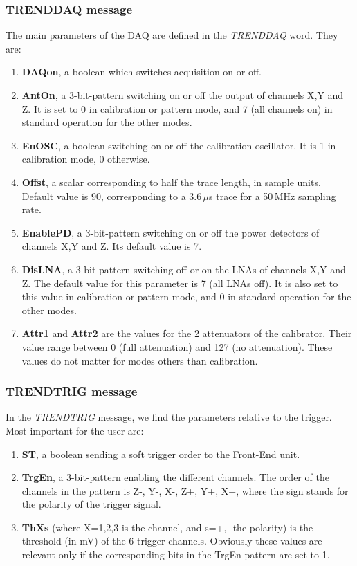 \subsubsection{TRENDDAQ message}
\label{TRENDDAQ}
The main  parameters of the DAQ are defined in the {\it TRENDDAQ} word. They are:
\begin{enumerate}[-]
\item{{\bf DAQon}, a boolean which switches acquisition on or off.} 
\item{{\bf AntOn}, a 3-bit-pattern switching on or off the output of channels X,Y and Z. It is set to 0 in calibration or pattern mode, and 7 (all channels on) in standard operation for the other modes.}
\item{{\bf EnOSC}, a boolean switching on or off the calibration oscillator. It is 1 in calibration mode, 0 otherwise. }
\item{{\bf Offst}, a scalar corresponding to half the trace length, in sample units. Default value is 90, corresponding to a 3.6\,$\mu$s trace for a 50\,MHz sampling rate.}
\item{{\bf EnablePD}, a 3-bit-pattern switching on or off the power detectors of channels X,Y and Z. Its default value is 7.}	
\item{{\bf DisLNA}, a 3-bit-pattern switching off or on the LNAs of channels X,Y and Z.  The default value for this parameter is 7 (all LNAs off). It is also set to this value in calibration or pattern mode, and 0 in standard operation for the other modes. }
\item{{\bf Attr1} and {\bf Attr2} are the values for the 2 attenuators of the calibrator. Their value range between 0 (full attenuation) and 127 (no attenuation). These values do not matter for modes others than calibration.} 
\end{enumerate}

\subsubsection{TRENDTRIG message}
\label{TRENDTRIG}
In the {\it TRENDTRIG} message, we find the parameters relative to the trigger. Most important for the user are:
\begin{enumerate}[-]
\item{{\bf ST}, a boolean sending a soft trigger order to the Front-End unit.}
\item{{\bf TrgEn},  a 3-bit-pattern enabling the different channels. The order of the channels in the pattern is Z-, Y-, X-, Z+, Y+, X+, where the sign stands for the polarity of the trigger signal.}
\item{{\bf ThXs} (where X=1,2,3 is the channel, and s=+,- the polarity) is the threshold (in mV) of the 6 trigger channels. Obviously these values are relevant only if the corresponding bits in the TrgEn pattern are set to 1.}
\end{enumerate}
